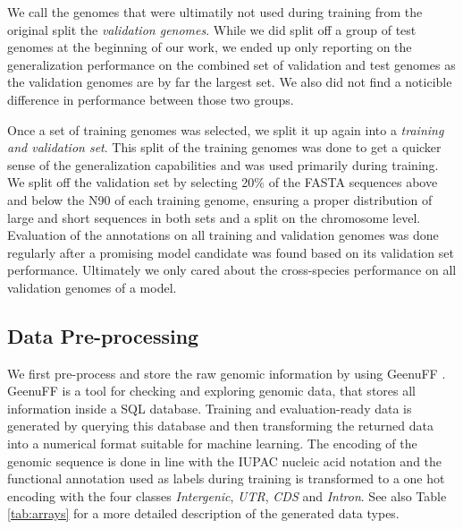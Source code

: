 \documentclass{bioinfo}
\begin{document}
\begin{methods}
We call the genomes that were ultimatily not used during training from the original split the {\it validation genomes}. While we did split off a group of test genomes at the beginning of our work, we ended up only reporting on the generalization performance on the combined set of validation and test genomes as the validation genomes are by far the largest set. We also did not find a noticible difference in performance between those two groups. 

Once a set of training genomes was selected, we split it up again into a {\it training and validation set}. This split of the training genomes was done to get a quicker sense of the generalization capabilities and was used primarily during training. We split off the validation set by selecting 20\% of the FASTA sequences above and below the N90 of each training genome, ensuring a proper distribution of large and short sequences in both sets and a split on the chromosome level. Evaluation of the annotations on all training and validation genomes was done regularly after a promising model candidate was found based on its validation set performance. Ultimately we only cared about the cross-species performance on all validation genomes of a model.

\subsection{Data Pre-processing}
We first pre-process and store the raw genomic information by using GeenuFF \citep{denton2019}. GeenuFF is a tool for checking and exploring genomic data, that stores all information inside a SQL database. Training and evaluation-ready data is generated by querying this database and then transforming the returned data into a numerical format suitable for machine learning. The encoding of the genomic sequence is done in line with the IUPAC nucleic acid notation and the functional annotation used as labels during training is transformed to a one hot encoding with the four classes {\it Intergenic}, {\it UTR}, {\it CDS} and {\it Intron}. See also Table \ref{tab:arrays} for a more detailed description of the generated data types.


\end{methods}
\end{document}
